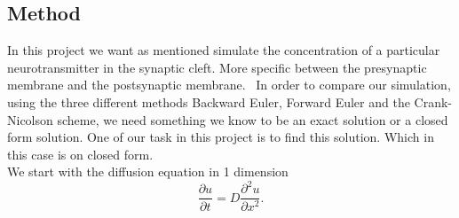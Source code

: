\documentclass[a4paper,12pt, english]{article}
\begin{document}
\subsection*{Method}

In this project we want as mentioned simulate the concentration of a particular neurotransmitter in the synaptic cleft. More specific between the presynaptic membrane and the postsynaptic membrane. \
In order to compare our simulation, using the three different methods Backward Euler, Forward Euler and the Crank-Nicolson scheme, we need something we know to be an exact solution or a closed form solution. One of our task in this project is to find this solution. Which in this case is on closed form. 
\\
We start with the diffusion equation in 1 dimension
\\
\begin{equation}
\frac{\partial u}{\partial t} = D\frac{\partial^2 u}{\partial x^2}.
\label{eq:diffusion_1d}
\end{equation}	
\\
\end{document}
